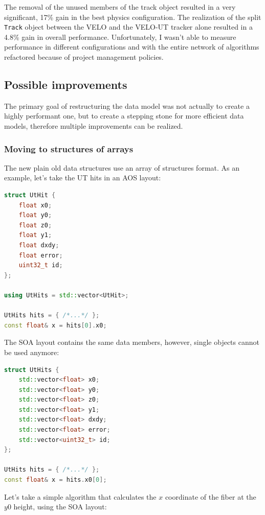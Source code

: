 \documentclass[12pt]{article}
\newcommand{\code}[1]{\texttt{#1}}
\begin{document}
The removal of the unused members of the track object resulted in a very significant, 17\% gain in the best physics configuration. The realization of the split \code{Track} object between the VELO and the VELO-UT tracker alone resulted in a 4.8\% gain in overall performance. Unfortunately, I wasn't able to measure performance in different configurations and with the entire network of algorithms refactored because of project management policies.


\subsection{Possible improvements}

The primary goal of restructuring the data model was not actually to create a highly performant one, but to create a stepping stone for more efficient data models, therefore multiple improvements can be realized.

\subsubsection{Moving to structures of arrays}

The new plain old data structures use an array of structures format. As an example, let's take the UT hits in an AOS layout:

\begin{lstlisting}[language=C++]
struct UtHit {
	float x0;
	float y0;
	float z0;
	float y1;
	float dxdy;
	float error;
	uint32_t id;
};

using UtHits = std::vector<UtHit>;

UtHits hits = { /*...*/ };
const float& x = hits[0].x0;
\end{lstlisting}

The SOA layout contains the same data members, however, single objects cannot be used anymore:

\begin{lstlisting}[language=C++]
struct UtHits {
	std::vector<float> x0;
	std::vector<float> y0;
	std::vector<float> z0;
	std::vector<float> y1;
	std::vector<float> dxdy;
	std::vector<float> error;
	std::vector<uint32_t> id;
};

UtHits hits = { /*...*/ };
const float& x = hits.x0[0];
\end{lstlisting}

Let's take a simple algorithm that calculates the $x$ coordinate of the fiber at the $y0$ height, using the SOA layout:
\end{document}
